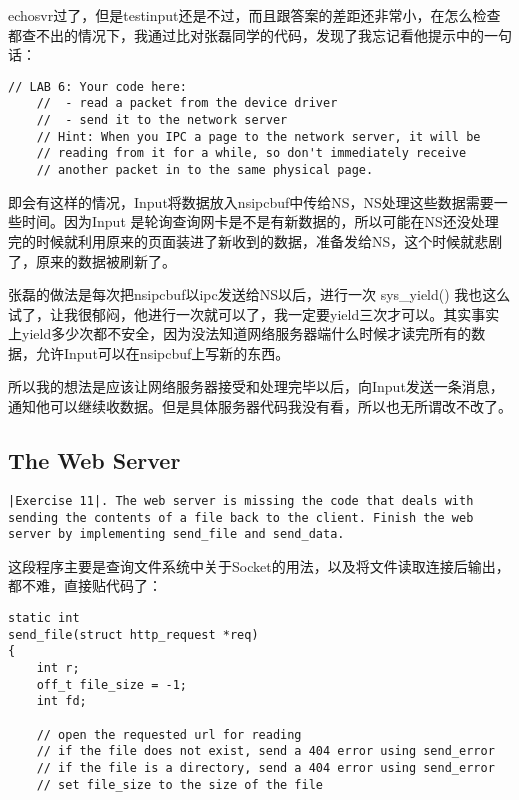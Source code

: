 \documentclass{article}
\newcommand{\funcname}[1]{{\ttfamily \small #1}}
\begin{document}
\begin{CJK*}{UTF8}{gkai}
echosvr过了，但是testinput还是不过，而且跟答案的差距还非常小，在怎么检查都查不出的情况下，我通过比对张磊同学的代码，发现了我忘记看他提示中的一句话：

\begin{lstlisting}[style=challenge]
    // LAB 6: Your code here:
    // 	- read a packet from the device driver
    //	- send it to the network server
    // Hint: When you IPC a page to the network server, it will be
    // reading from it for a while, so don't immediately receive
    // another packet in to the same physical page.
\end{lstlisting}

即会有这样的情况，Input将数据放入nsipcbuf中传给NS，NS处理这些数据需要一些时间。因为Input 是轮询查询网卡是不是有新数据的，所以可能在NS还没处理完的时候就利用原来的页面装进了新收到的数据，准备发给NS，这个时候就悲剧了，原来的数据被刷新了。

张磊的做法是每次把nsipcbuf以ipc发送给NS以后，进行一次 \funcname{sys\_yield()} 我也这么试了，让我很郁闷，他进行一次就可以了，我一定要yield三次才可以。其实事实上yield多少次都不安全，因为没法知道网络服务器端什么时候才读完所有的数据，允许Input可以在nsipcbuf上写新的东西。

所以我的想法是应该让网络服务器接受和处理完毕以后，向Input发送一条消息，通知他可以继续收数据。但是具体服务器代码我没有看，所以也无所谓改不改了。


\subsection{The Web Server}

\begin{lstlisting}[style=exercise]
|Exercise 11|. The web server is missing the code that deals with sending the contents of a file back to the client. Finish the web server by implementing send_file and send_data.
\end{lstlisting}

这段程序主要是查询文件系统中关于Socket的用法，以及将文件读取连接后输出，都不难，直接贴代码了：

\begin{lstlisting}[style=ccode, title={\scriptsize \ttfamily \bfseries user/httpd.c: send\_file()}]
static int
send_file(struct http_request *req)
{
	int r;
	off_t file_size = -1;
	int fd;

	// open the requested url for reading
	// if the file does not exist, send a 404 error using send_error
	// if the file is a directory, send a 404 error using send_error
	// set file_size to the size of the file


\end{lstlisting}
\end{CJK*}
\end{document}
